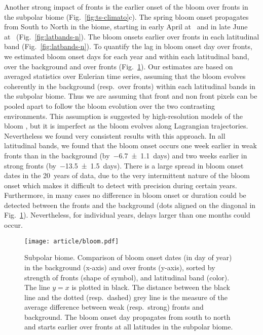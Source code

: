 Another strong impact of fronts is the earlier onset of the bloom over fronts in the subpolar biome (Fig.~\ref{fig:ts-climato}c).
The spring bloom onset propagates from South to North in the biome, starting in early April at~ and in late June at~ (Fig.~\ref{fig:latbands-n}).
The bloom onsets earlier over fronts in each latitudinal band (Fig.~\ref{fig:latbands-n}).
To quantify the lag in bloom onset day over fronts, we estimated bloom onset days for each year and within each latitudinal band, over the background and over fronts (Fig.~\ref{fig:bloom}).
Our estimates are based on averaged statistics over Eulerian time series, assuming that the bloom evolves coherently in the background (resp.\ over fronts) within each latitudinal bands in the subpolar biome.
Thus we are assuming that front and non front pixels can be pooled apart to follow the bloom evolution over the two contrasting environments.
This assumption is suggested by high-resolution models of the bloom \parencite[e.g.][]{levy_2005a, karleskind_2011}, but it is imperfect as the bloom evolves along Lagrangian trajectories.
Nevertheless we found very consistent results with this approach.
In all latitudinal bands, we found that the bloom onset occurs one week earlier in weak fronts than in the background (by~\num{-6.7 \pm 1.1}~days) and two weeks earlier in strong fronts (by~\num{-13.5 \pm 1.5}~days).
There is a large spread in bloom onset dates in the 20~years of data, due to the very intermittent nature of the bloom onset \parencite{keerthi_2021} which makes it difficult to detect with precision during certain years.
Furthermore, in many cases no difference in bloom onset or duration could be detected between the fronts and the background (dots aligned on the diagonal in Fig.~\ref{fig:bloom}).
Nevertheless, for individual years, delays larger than one months could occur.

\begin{figure}
  \centering
  \texttt{[image: article/bloom.pdf]}
  \caption[Comparison of bloom onset dates in the background and over fronts]{%
    Subpolar biome. Comparison of bloom onset dates (in day of year) in the background (x-axis) and over fronts (y-axis), sorted by strength of fronts (shape of symbol), and latitudinal band (color).
    The line \(y=x\) is plotted in black.
    The distance between the black line and the dotted (resp.\ dashed) grey line is the measure of the average difference between weak (resp.\ strong) fronts and background.
    The bloom onset day propagates from south to north and starts earlier over fronts at all latitudes in the subpolar biome.
  }%
  \label{fig:bloom}
\end{figure}



